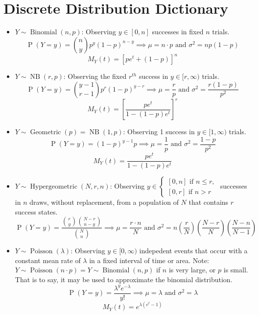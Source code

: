 \documentclass[12pt]{article}
\newcommand{\If}[1]{\textrm{ if #1}}
\newcommand{\defn}[1]{\textbf{#1}:}
\newcommand{\pr}[1]{\operatorname{P}(#1)}
\newcommand{\binomdist}[3]{#1 \sim \operatorname{Binomial}(#2, #3)}
\newcommand{\geodist}[2]{#1 \sim \operatorname{Geometric}(#2)}
\newcommand{\nbinomdist}[3]{#1 \sim \operatorname{NB}(#2, #3)}
\newcommand{\hypegeodist}[4]{#1 \sim \operatorname{Hypergeometric}(#2, #3, #4)}\newcommand{\setcompl}[1]{\overline{#1}}
\newcommand{\poisson}[2]{#1 \sim \operatorname{Poisson}(#2)}
\renewcommand{\and}{\text{ and }}
\begin{document}
\section{Discrete Distribution Dictionary}
\begin{itemize}
    \item \defn{$\binomdist{Y}{n}{p}$}
    Observing $y \in [0,n]$ successes in fixed $n$ trials.
    \[
        \pr{Y=y} = \binom{n}{y}p^y(1-p)^{n-y} \implies \mu = n\cdot p \and \sigma^2 = np(1-p)
    \]
    \[
        M_Y(t) = \left[pe^t+(1-p)\right]^n
    \]
    \item \defn{$\nbinomdist{Y}{r}{p}$}
    Observing the fixed $r^{th}$ success in $y \in [r, \infty)$ trials.
    \[
        \pr{Y=y} = \binom{y-1}{r-1}p^{r}(1-p)^{y-r} \implies \mu = \frac{r}{p} \and \sigma^2 = \frac{r(1-p)}{p^2}
    \]
    \[
        M_Y(t) = {\left[\frac{pe^t}{1-(1-p)e^t}\right]}^r
    \]
    \item \defn{$\geodist{Y}{p} = \operatorname{NB}(1,p)$}
    Observing 1 success in $y \in [1, \infty)$ trials.
    \[
        \pr{Y=y} = (1-p)^{y-1}p \implies \mu = \frac{1}{p} \and \sigma^2 = \frac{1-p}{p^2}
    \]
    \[
        M_Y(t) = \frac{pe^t}{1-(1-p)e^t}
    \]
    \item \defn{$\hypegeodist{Y}{N}{r}{n}$}
    Observing $y \in \begin{cases}
        [0, n] \If{} n \leq r,\\
        [0, r] \If{} n > r
    \end{cases}$ successes in $n$ draws, without replacement,
    from a population of $N$ that contains $r$ success states.
    \[
        \pr{Y=y} = \frac{\binom{r}{y}\binom{N-r}{n-y}}{\binom{N}{n}}
        \implies \mu = \frac{r\cdot n}{N} \and \sigma^2 = 
        n\left(\frac{r}{N}\right)\left(\frac{N-r}{N}\right)\left(\frac{N-n}{N-1}\right)
    \]

    \item \defn{$\poisson{Y}{\lambda}$}
    Observing $y\in [0,\infty)$ indepedent events that occur with a
    constant mean rate of $\lambda$ in a fixed interval of time or area.
    Note: $\poisson{Y}{n\cdot p} = \binomdist{Y}{n}{p}$ if $n$ is very large, or $p$ is small.
    That is to say, it may be used to approximate the binomial distribution.
    \[
        \pr{Y=y} = \frac{\lambda^{y}e^{-\lambda}}{y!} \implies \mu = \lambda \and \sigma^2 = \lambda
    \]
    \[
        M_Y(t) = e^{\lambda(e^t-1)}
    \]
\end{itemize}
\end{document}

